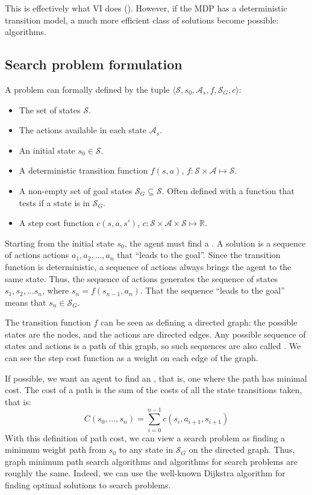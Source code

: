 This is effectively what \acl{VI} does (). However, if the
\ac{MDP} has a deterministic transition model, a much more efficient class of
solutions become possible:  algorithms.

\subsection{Search problem formulation}

A problem can formally defined by the tuple $\langle \mathcal{S}, s_0,
\mathcal{A}_s, f, \mathcal{S}_G, c \rangle$:

\begin{itemize}
  \item The set of states $\mathcal{S}$.
  \item The actions available in each state $\mathcal{A}_s$.
  \item An initial state $s_0\in\mathcal{S}$.
  \item A deterministic transition function $f(s, a)$, $f : \mathcal{S}
\times \mathcal{A} \mapsto \mathcal{S}$.
  \item A non-empty set of goal states $\mathcal{S}_G \subseteq \mathcal{S}$.
Often defined with a function that tests if a state is in $\mathcal{S}_G$.
  \item A step cost function $c(s, a, s')$, $c : \mathcal{S} \times \mathcal{A}
    \times \mathcal{S} \mapsto \mathbb{R}$.
\end{itemize}

Starting from the initial state $s_0$, the agent must find a
. A solution is a sequence of actions actions $a_1, a_2,
\dots, a_n$ that ``leads to the goal''. Since the transition function is
deterministic, a sequence of actions always brings the agent to the same state.
Thus, the sequence of actions generates the sequence of states $s_1, s_2, \dots
s_n$, where $s_n = f(s_{n-1}, a_n)$. That the sequence ``leads to the goal''
means that $s_n \in \mathcal{S}_G$.

The transition function $f$ can be seen as defining a directed graph: the
possible states are the nodes, and the actions are directed edges. Any possible sequence of
states and actions is a path of this graph, so such sequences are also called
. We can see the step cost function as a weight on each edge
of the graph.

If possible, we want an agent to find an , that is,
one where the path has minimal cost. The cost of a path is the sum of the costs
of all the state transitions taken, that is:
\begin{equation}
C(s_0,\dots,s_n) = \sum_{i=0}^{n-1}c(s_i, a_{i+1}, s_{i+1})
\end{equation}
With this definition of path cost, we can view a search problem as finding a
minimum weight path from $s_0$ to any state in $\mathcal{S}_G$ on the directed
graph. Thus, graph minimum path search algorithms and algorithms for search
problems are roughly the same. Indeed, we can use the well-known Dijkstra
algorithm for finding optimal solutions to search problems.

